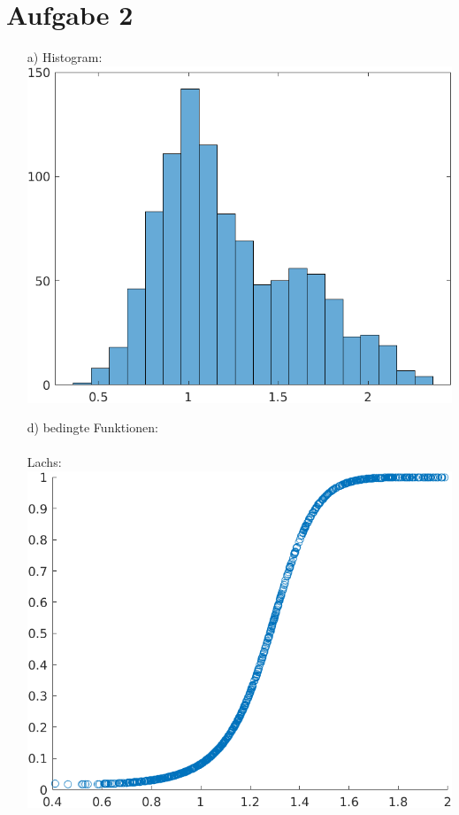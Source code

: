 \documentclass[a4paper]{scrartcl}
\begin{document}
\section*{Aufgabe 2}
\begin{itemize}
	\item[a)] Histogram:\\
	\includegraphics*[scale = 0.5]{assignment2_data/plots/hist_fish.png}
	\item[d)] bedingte Funktionen:\\ \ \\
	Lachs:\\
	\includegraphics*[scale=0.5]{assignment2_data/plots/cond_function_salmon.png}\\ \ \\

\end{itemize}
\end{document}
